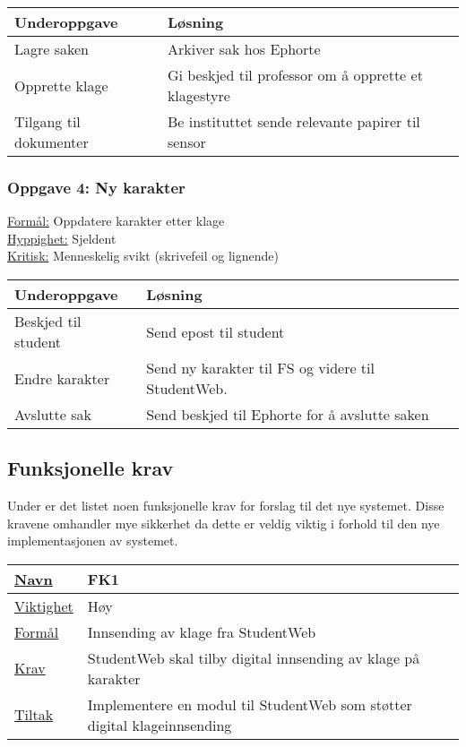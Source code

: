 \begin{tabularx}{\textwidth}{|l|X|}
  \hline
  Underoppgave & Løsning \\ \hline
  Lagre saken & Arkiver sak hos Ephorte \\ \hline
  Opprette klage & Gi beskjed til professor om å opprette et klagestyre \\ \hline
  Tilgang til dokumenter & Be instituttet sende relevante papirer til sensor \\ \hline
\end{tabularx}

\subsubsection*{Oppgave 4: Ny karakter}

\underline{Formål:} Oppdatere karakter etter klage\\
\underline{Hyppighet:} Sjeldent\\
\underline{Kritisk:} Menneskelig svikt (skrivefeil og lignende)

\begin{tabularx}{\textwidth}{|l|X|}
  \hline
  Underoppgave & Løsning \\ \hline
  Beskjed til student & Send epost til student \\ \hline
  Endre karakter & Send ny karakter til FS og videre til StudentWeb. \\ \hline
  Avslutte sak & Send beskjed til Ephorte for å avslutte saken \\ \hline
\end{tabularx}

\subsection{Funksjonelle krav}

Under er det listet noen funksjonelle krav for forslag til det nye systemet. Disse kravene omhandler mye sikkerhet da dette er veldig viktig i forhold til den nye
implementasjonen av systemet. 

\begin{tabularx}{\textwidth}{|l|X|}
  \hline
  \underline{Navn} & FK1 \\ \hline
  \underline{Viktighet} & Høy \\ \hline
  \underline{Formål} & Innsending av klage fra StudentWeb \\ \hline
  \underline{Krav} & StudentWeb skal tilby digital innsending av klage på karakter \\ \hline
  \underline{Tiltak} & Implementere en modul til StudentWeb som støtter digital klageinnsending \\ \hline
\end{tabularx}

